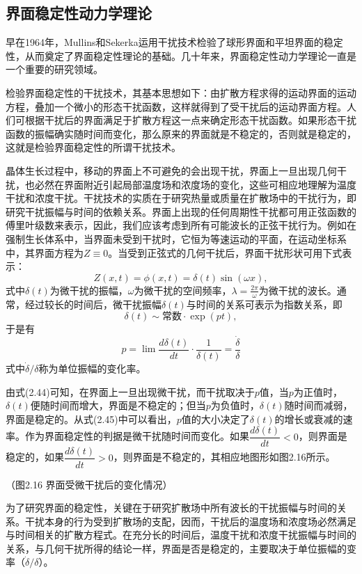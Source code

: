 \subsection{界面稳定性动力学理论}
早在1964年，Mullins和Sekerka运用干扰技术检验了球形界面和平坦界面的稳定性，从而奠定了界面稳定性理论的基础。几十年来，界面稳定性动力学理论一直是一个重要的研究领域。

检验界面稳定性的干扰技术，其基本思想如下：由扩散方程求得的运动界面的运动方程，叠加一个微小的形态干扰函数，这样就得到了受干扰后的运动界面方程。人们可根据干扰后的界面满足于扩散方程这一点来确定形态干扰函数。如果形态干扰函数的振幅确实随时间而变化，那么原来的界面就是不稳定的，否则就是稳定的，这就是检验界面稳定性的所谓干扰技术。

晶体生长过程中，移动的界面上不可避免的会出现干扰，界面上一旦出现几何干扰，也必然在界面附近引起局部温度场和浓度场的变化，这些可相应地理解为温度干扰和浓度干扰。干扰技术的实质在于研究热量或质量在扩散场中的干扰行为，即研究干扰振幅与时间的依赖关系。界面上出现的任何周期性干扰都可用正弦函数的傅里叶级数来表示，因此，我们应该考虑到所有可能波长的正弦干扰行为。例如在强制生长体系中，当界面未受到干扰时，它恒为等速运动的平面，在运动坐标系中，其界面方程为$Z\equiv 0$。当受到正弦式的几何干扰后，界面干扰形状可用下式表示：
\begin{equation}
Z(x,t)=\phi(x,t)=\delta(t)\sin(\omega x),
\end{equation}
式中$\delta(t)$为微干扰的振幅，$\omega$为微干扰的空间频率，$\lambda=\frac{2\pi}{\omega}$为微干扰的波长。通常，经过较长的时间后，微干扰振幅$\delta(t)$与时间的关系可表示为指数关系，即
\begin{equation}
\delta(t)\sim\text{常数}\cdot\exp(pt),
\end{equation}
于是有
\begin{equation}
p=\lim\frac{d\delta(t)}{dt}\cdot\frac{1}{\delta(t)}=\frac{\dot{\delta}}{\delta}
\end{equation}
式中$\dot{\delta}/\delta$称为单位振幅的变化率。

由式(2.44)可知，在界面上一旦出现微干扰，而干扰取决于$p$值，当$p$为正值时，$\delta(t)$便随时间而增大，界面是不稳定的；但当$p$为负值时，$\delta(t)$随时间而减弱，界面是稳定的。从式(2.45)中可以看出，$p$值的大小决定了$\delta(t)$的增长或衰减的速率。作为界面稳定性的判据是微干扰随时间而变化。如果$\dfrac{d\delta(t)}{dt}<0$，则界面是稳定的，如果$\dfrac{d\delta(t)}{dt}>0$，则界面是不稳定的，其相应地图形如图2.16所示。

（图2.16 界面受微干扰后的变化情况）

为了研究界面的稳定性，关键在于研究扩散场中所有波长的干扰振幅与时间的关系。干扰本身的行为受到扩散场的支配，因而，干扰后的温度场和浓度场必然满足与时间相关的扩散方程式。在充分长的时间后，温度干扰和浓度干扰振幅与时间的关系，与几何干扰所得的结论一样，界面是否是稳定的，主要取决于单位振幅的变率（$\dot{\delta}/\delta$）。


